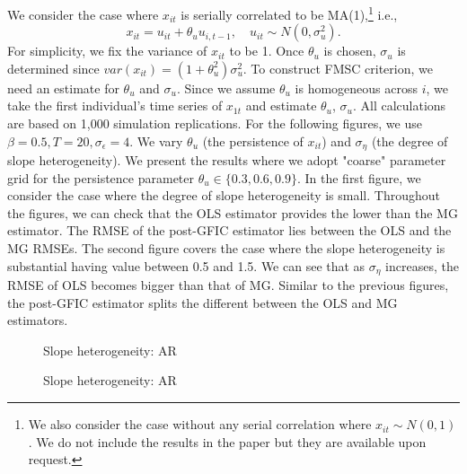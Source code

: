 We consider the case where $x_{it}$ is serially correlated to be MA(1),\footnote{We also consider the case without any serial correlation where $x_{it} \sim N(0,1)$. We do not include the results in the paper but they are available upon request.} i.e., 
\[
x_{it} = u_{it} + \theta_u u_{i,t-1}, \quad u_{it} \sim N(0, \sigma_u^2).
\]
 For simplicity, we fix the variance of $x_{it}$ to be 1. Once $\theta_u$ is chosen, $\sigma_u$ is determined since $var(x_{it}) = (1+\theta_u^2)\sigma_u^2.$ To construct FMSC criterion, we need an estimate for $\theta_u$ and $\sigma_u$. Since we assume $\theta_u$ is homogeneous across $i$, we take the first individual's time series of $x_{1t}$ and estimate $\theta_u$, $\sigma_u$. All calculations are based on 1,000 simulation replications. For the following figures, we use $\beta = 0.5, T = 20, \sigma_\epsilon = 4$. We vary $\theta_u$ (the persistence of $x_{it}$) and $\sigma_\eta$ (the degree of slope heterogeneity). We present the results where we adopt "coarse" parameter grid for the persistence parameter $\theta_u \in \{0.3, 0.6, 0.9\}$. In the first figure, we consider the case where the degree of slope heterogeneity is small. Throughout the figures, we can check that the OLS estimator provides the lower than the MG estimator. The RMSE of the post-GFIC estimator lies between the OLS and the MG RMSEs. The second figure covers the case where the slope heterogeneity is substantial having value between 0.5 and 1.5. We can see that as $\sigma_\eta$ increases, the RMSE of OLS becomes bigger than that of MG. Similar to the previous figures, the post-GFIC estimator splits the different between the OLS and MG estimators.

\begin{figure}
  
  \caption{Slope heterogeneity: AR}
\end{figure}

\begin{figure}
  
  \caption{Slope heterogeneity: AR}
\end{figure}
